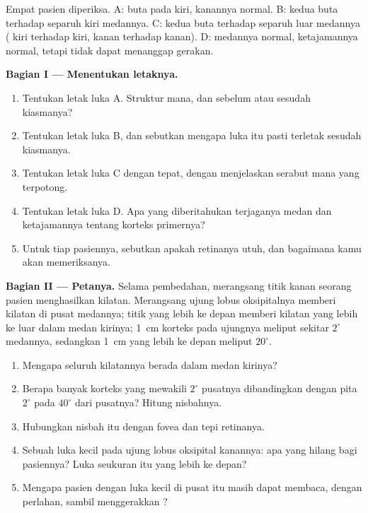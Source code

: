 \begin{problem}
\label{pb:g11:vision-and-brain:1}
Empat pasien diperiksa. A: buta pada  kiri,  kanannya normal.
B: kedua  buta terhadap separuh kiri medannya. C: kedua 
buta terhadap separuh luar medannya ( kiri terhadap kiri, 
kanan terhadap kanan). D: medannya normal, ketajamannya normal, tetapi
tidak dapat menanggap gerakan.

\medskip
\noindent\textbf{Bagian I --- Menentukan letaknya.}
\begin{enumerate}
  \item Tentukan letak luka A. Struktur mana, dan sebelum atau sesudah
        kiasmanya?
  \item Tentukan letak luka B, dan sebutkan mengapa luka itu pasti
        terletak sesudah kiasmanya.
  \item Tentukan letak luka C dengan tepat, dengan menjelaskan serabut
        mana yang terpotong.
  \item Tentukan letak luka D. Apa yang diberitahukan terjaganya medan
        dan ketajamannya tentang korteks primernya?
  \item Untuk tiap pasiennya, sebutkan apakah retinanya utuh, dan
        bagaimana kamu akan memeriksanya.
\end{enumerate}

\medskip
\noindent\textbf{Bagian II --- Petanya.}
Selama pembedahan, merangsang titik  kanan seorang
pasien menghasilkan kilatan. Merangsang ujung lobus oksipitalnya
memberi kilatan di pusat medannya; titik yang lebih ke depan memberi
kilatan yang lebih ke luar dalam medan kirinya; \qty{1}{cm} korteks
pada ujungnya meliput sekitar $2^\circ$ medannya, sedangkan \qty{1}{cm}
yang lebih ke depan meliput $20^\circ$.
\begin{enumerate}[resume]
  \item Mengapa seluruh kilatannya berada dalam medan kirinya?
  \item Berapa banyak korteks yang mewakili $2^\circ$ pusatnya
        dibandingkan dengan pita $2^\circ$ pada $40^\circ$ dari
        pusatnya? Hitung nisbahnya.
  \item Hubungkan nisbah itu dengan fovea dan tepi retinanya.
  \item Sebuah luka kecil pada ujung lobus oksipital kanannya: apa yang
        hilang bagi pasiennya? Luka seukuran itu yang lebih ke depan?
  \item Mengapa pasien dengan luka kecil di pusat itu masih dapat
        membaca, dengan perlahan, sambil menggerakkan ?
\end{enumerate}


\end{problem}
